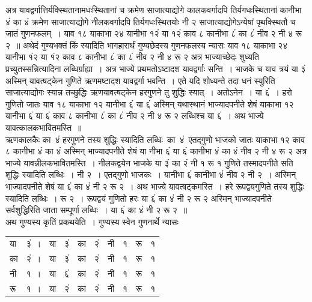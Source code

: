\documentclass[11pt, openany]{book}
\begin{document}
अत्र यावद्वर्गात्तिर्यक्स्थितानामधःस्थितानां च क्रमेण साजात्याद्योगे
कालकवर्गादपि 
तिर्यगधःस्थितानां कानीभा ४ं का ४ं क्रमेण साजात्याद्योगे नीलकवर्गादपि
तिर्यगधःस्थितयोः नी २ साजात्याद्योगेऽन्येषां पृथक्स्थितौ च जातं 
गुणनफलम्~। याव १८ याकाभा २४ यानीभा १२ं या १२ं काव ८ कानीभा ८ं 
का ८ं नीव २ नी ४ रू २~॥ 
\newpage
 अथेदं गुण्यभक्तं किं स्यादिति भागहारार्थं गुण्यछेदस्य गुणनफलस्य 
न्यासः याव १८ याकाभा २४ यानीभा १ं२ या १ं२ काव ८ कानीभा ८ं 
का ८ं नीव २ नी ४ रू २ अत्र भाज्याच्छेदः शुध्यति प्रच्युतस्सन्नित्यादिना
लब्धिर्ग्राह्या~। अत्र भाज्ये प्रथमतोऽष्टादश यावद्वर्गाः सन्ति~। भाजके च
याव त्रयं या ३ं अस्मिन् यावत्षट्केन गुणिते ऋणमष्टादश यावद्वर्गा भवन्ति~। एते यदि 
शोध्यन्ते तदा धनं स्युरिति साजात्याद्योगः स्यान्न तच्छुद्धिः ऋणयावत्षट्केन 
हरगुणने तु शुद्धिः स्यात्~। अतोऽनेन~। या ६ं~। हरो गुणितो जातः याव १८ 
याकाभा १२ यानीभा ६ं या ६ं अस्मिन् यथास्थानं भाज्यादपनीते शेषं 
याकाभा १२ यानीभा ६ं या ६ं काव ८ कानीभा ८ं का ८ं नीव २ नी ४ 
रू २ लब्धिश्च या ६ं~। अथ भाज्ये यावत्कालकभावितमस्ति~॥ \\

\vspace{-3mm}
 ऋणकालकैः \;का \,४ं \;हरगुणने \;तस्य \;शुद्धिः \;स्यादिति \;लब्धिः \,का \,४ं \,एतद्गुणो भाजको जातः याकाभा १२ काव ८ कानीभा ४ं का ४ं 
अस्मिन् भाज्यादपनीते शेषं या नीभा ६ं या ६ं कानीभा ४ं का ४ं नीव २ 
नी ४ रू २ अत्र भाज्ये यावन्नीलकभावितमस्ति~। नीलकद्वयेन भाजके 
या ३ं का २ं नी १ रू १ गुणिते तस्मादपनीते सति शुद्धिः स्यादिति 
लब्धिः~। नी २~। एतद्गुणो भाजकः~। यानीभा ६ं कानीभा ४ं नीव २ नी २~। 
अस्मिन् भाज्यादपनीते शेषं या ६ं का ४ं नी २ रू २~। अथ भाज्ये 
यावत्षट्कमस्ति~। हरे रूपद्वयगुणिते तस्य शुद्धिः स्यादिति लब्धिः~। रू २~। 
रूपद्वयं गुणितो हरः या ६ं का ४ं नी २ रू २ अस्मिन् भाज्यादपनीते 
सर्वशुद्धिरिति जाता सम्पूर्णा लब्धिः~। या ६ं का ४ं नी २ रू २~॥\\

\vspace{-3mm}
 अथ गुण्यस्य कृतिं प्रकथयेति~। गुण्यस्य स्वेन गुणनार्थे न्यासः 
\vspace{-1mm}

\begin{table}[h!]
\centering
\renewcommand{\arraystretch}{1.1}
\begin{tabular}{llllllllll}
 या &  ३ं~। & या& ३ं &का &२ं& नी& १& रू& १ \\
 का &२ं~।& या& ३ं &का& २ं &नी& १& रू& १ \\
 नी &१~।& या& ६ं& का& २ं &नी& १& रू& १ \\
 रू &१~।& या& २ं &का& २ं &नी& १& रू& १ 
\end{tabular}
\end{table}
\newpage
\end{document}
